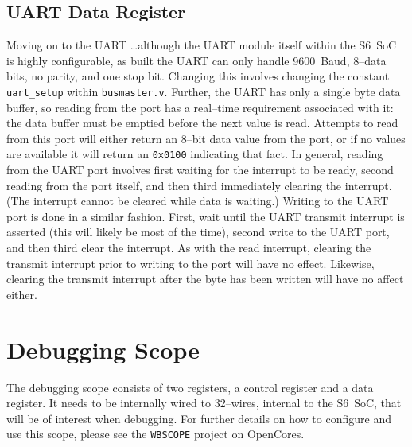 \documentclass{gqtekspec}
\begin{document}
\subsection{UART Data Register}
Moving on to the UART \ldots although the UART module itself
within the S6~SoC is highly configurable, as built
the UART can only handle 9600~Baud, 8--data bits, no parity, and one stop bit.
Changing this involves changing the constant {\tt uart\_setup} within 
{\tt busmaster.v}.  Further,  the UART has only a single byte data buffer, so
reading from the port has a real--time requirement associated with it: the
data buffer must be emptied before the next value is read. 
Attempts to read from this port will either return an 8--bit data value from
the port, or if no values are available it will return an {\tt 0x0100}
indicating that fact.  In general, reading from the UART port involves first
waiting for the interrupt to be ready, second reading from the port itself,
and then third immediately  clearing the interrupt.  (The interrupt cannot
be cleared while data is waiting.)  Writing to the UART port is done in a 
similar fashion.  First, wait until the UART transmit interrupt is asserted
(this will likely be most of the time), second write to the UART port, and
then third clear the interrupt.  As with the read interrupt, clearing the
transmit interrupt prior to writing to the port will have no effect.  Likewise,
clearing the transmit interrupt after the byte has been written will have no
affect either.

\section{Debugging Scope}
The debugging scope consists of two registers, a control register and a data
register.  It needs to be internally wired to 32--wires, internal to the
S6~SoC, that will be of interest when debugging.  For further details on how
to configure and use this scope, please see the {\tt WBSCOPE} project on
OpenCores.
\end{document}

